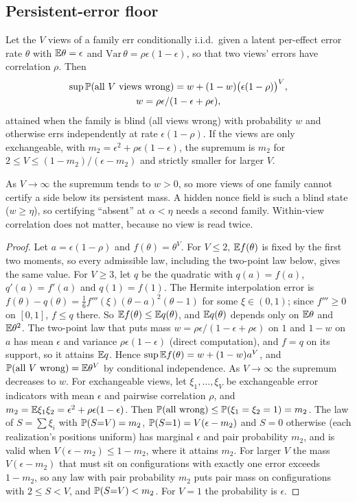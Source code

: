 \subsection{Persistent-error floor}
\begin{lemma}
\label{lem:floor}
Let the $V$ views of a family err conditionally i.i.d.\ given a latent per-effect error rate $\theta$ with $\mathbb{E}\theta=\epsilon$ and $\mathrm{Var}\,\theta=\rho\epsilon(1-\epsilon)$,
so that two views' errors have correlation $\rho$. Then
\begin{gather*}
\sup\mathbb{P}(\text{all $V$ views wrong})=w+(1-w)\big(\epsilon(1-\rho)\big)^V,\\
w=\rho\epsilon/(1-\epsilon+\rho\epsilon),
\end{gather*}
attained when the family is blind (all views wrong) with probability $w$ and otherwise errs independently at rate $\epsilon(1-\rho)$.
If the views are only exchangeable, with $m_2=\epsilon^2+\rho\epsilon(1-\epsilon)$, the supremum is $m_2$ for $2\le V\le(1-m_2)/(\epsilon-m_2)$ and strictly smaller for larger $V$.
\end{lemma}
As $V\to\infty$ the supremum tends to $w>0$, so more views of one family cannot certify a side below its persistent mass. A hidden nonce field is such a blind state ($w\ge\eta$),
so certifying ``absent'' at $\alpha<\eta$ needs a second family. Within-view correlation does not matter, because no view is read twice.

\begin{proof}
Let $a=\epsilon(1-\rho)$ and $f(\theta)=\theta^V$. For $V\le2$, $\mathbb{E} f(\theta)$ is fixed by the first two moments, so every admissible law, including the two-point law below, gives the same
value. For $V\ge3$, let $q$ be the quadratic with $q(a)=f(a)$, $q'(a)=f'(a)$ and $q(1)=f(1)$. The Hermite interpolation error is $f(\theta)-q(\theta)=\tfrac{1}{6}f'''(\xi)(\theta-a)^2(\theta-1)$
for some $\xi\in(0,1)$; since $f'''\ge0$ on $[0,1]$, $f\le q$ there. So $\mathbb{E} f(\theta)\le\mathbb{E} q(\theta)$, and $\mathbb{E} q(\theta)$ depends only on $\mathbb{E}\theta$ and $\mathbb{E}\theta^2$. The two-point law
that puts mass $w=\rho\epsilon/(1-\epsilon+\rho\epsilon)$ on $1$ and $1-w$ on $a$ has mean $\epsilon$ and variance $\rho\epsilon(1-\epsilon)$ (direct computation), and $f=q$ on its support,
so it attains $\mathbb{E} q$. Hence $\sup\mathbb{E} f(\theta)=w+(1-w)a^V$, and $\mathbb{P}(\text{all $V$ wrong})=\mathbb{E}\theta^V$ by conditional independence. As $V\to\infty$ the supremum decreases to $w$.
For exchangeable views, let $\xi_1,\dots,\xi_V$ be exchangeable error indicators with mean $\epsilon$ and pairwise correlation $\rho$, and $m_2=\mathbb{E}\xi_1\xi_2=\epsilon^2+\rho\epsilon(1-\epsilon)$.
Then $\mathbb{P}(\text{all wrong})\le\mathbb{P}(\xi_1=\xi_2=1)=m_2$. The law of $S=\sum\xi_i$ with $\mathbb{P}(S{=}V)=m_2$, $\mathbb{P}(S{=}1)=V(\epsilon-m_2)$ and $S=0$ otherwise (each realization's positions uniform)
has marginal $\epsilon$ and pair probability $m_2$, and is valid when $V(\epsilon-m_2)\le1-m_2$, where it attains $m_2$. For larger $V$ the mass $V(\epsilon-m_2)$ that
must sit on configurations with exactly one error exceeds $1-m_2$, so any law with pair probability $m_2$ puts pair mass on configurations with $2\le S<V$, and
$\mathbb{P}(S{=}V)<m_2$. For $V{=}1$ the probability is $\epsilon$.
\end{proof}


